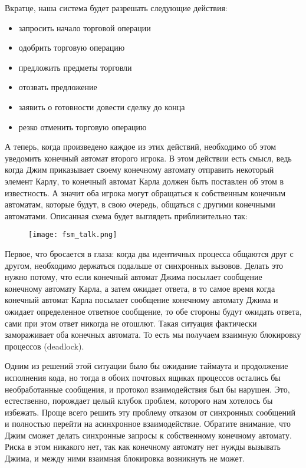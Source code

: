 Вкратце, наша система будет разрешать следующие действия:
\begin{itemize}
    \item запросить начало торговой  операции
    \item одобрить торговую операцию
    \item предложить предметы торговли
    \item отозвать предложение
    \item заявить о готовности довести сделку до конца
    \item резко отменить торговую операцию
\end{itemize}
А теперь, когда произведено каждое из этих действий, необходимо об этом уведомить конечный автомат второго игрока.
В этом действии есть смысл, ведь когда Джим приказывает своему конечному автомату отправить некоторый элемент Карлу, то конечный автомат Карла должен быть поставлен об этом в известность.
А значит оба игрока могут обращаться к собственным конечным автоматам, которые будут, в свою очередь, общаться с другими конечными автоматами.
Описанная схема будет выглядеть приблизительно так:
\begin{figure}[h!]
    \centering
    \texttt{[image: fsm\_talk.png]}
\end{figure}

Первое, что бросается в глаза: когда два идентичных процесса общаются друг с другом, необходимо держаться подальше от синхронных вызовов.
Делать это нужно потому, что если конечный автомат Джима посылает сообщение конечному автомату Карла, а затем ожидает ответа, в то самое время когда конечный автомат Карла посылает сообщение конечному автомату Джима и ожидает определенное ответное сообщение, то обе стороны будут ожидать ответа, сами при этом ответ никогда не отошлют.
Такая ситуация фактически замораживает оба конечных автомата.
То есть мы получаем взаимную блокировку процессов (deadlock).

Одним из решений этой ситуации было бы ожидание таймаута и продолжение исполнения кода, но тогда в обоих почтовых ящиках процессов остались бы необработанные сообщения, и протокол взаимодействия был бы нарушен.
Это, естественно, порождает целый клубок проблем, которого нам хотелось бы избежать.
Проще всего решить эту проблему отказом от синхронных сообщений и полностью перейти на асинхронное взаимодействие.
Обратите внимание, что Джим сможет делать синхронные запросы к собственному конечному автомату.
Риска в этом никакого нет, так как конечному автомату нет нужды вызывать Джима, и между ними взаимная блокировка возникнуть не может.

